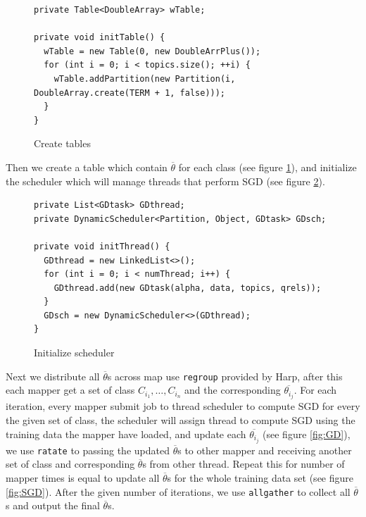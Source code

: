 \documentclass{sig-alternate-05-2015}
\begin{document}
\begin{figure}
\begin{lstlisting}
private Table<DoubleArray> wTable;
  
private void initTable() {
  wTable = new Table(0, new DoubleArrPlus());
  for (int i = 0; i < topics.size(); ++i) {
    wTable.addPartition(new Partition(i, DoubleArray.create(TERM + 1, false)));
  }
}
\end{lstlisting}
\caption{Create tables}
\label{fig:init}
\end{figure}

Then we create a table which contain $\overline{\theta}$ for each class (see figure \ref{fig:init}),
and initialize the scheduler which will manage threads that perform SGD (see figure \ref{fig:thread}).\par

\begin{figure}
\begin{lstlisting}
private List<GDtask> GDthread;
private DynamicScheduler<Partition, Object, GDtask> GDsch;

private void initThread() {
  GDthread = new LinkedList<>();
  for (int i = 0; i < numThread; i++) {
    GDthread.add(new GDtask(alpha, data, topics, qrels));
  }
  GDsch = new DynamicScheduler<>(GDthread);
}
\end{lstlisting}
\caption{Initialize scheduler}
\label{fig:thread}
\end{figure}


Next we distribute all $\overline{\theta}$s across map use \lstinline|regroup| provided by Harp,
after this each mapper get a set of class $C_{i_1},\ldots,C_{i_n}$ and the corresponding $\overline{\theta_{i_j}}$.
For each iteration, every mapper submit job to thread scheduler to compute SGD for every the given set of class,
the scheduler will assign thread to compute SGD using the training data the mapper have loaded,
and update each $\overline{\theta_{i_j}}$ (see figure \ref{fig:GD}), we use \lstinline|ratate| to passing the updated $\overline{\theta}$s to other mapper and
receiving another set of class and corresponding $\overline{\theta}$s from other thread.
Repeat this for number of mapper times is equal to update all $\overline{\theta}$s for the whole training data set (see figure \ref{fig:SGD}).
After the given number of iterations, we use \lstinline|allgather| to collect all $\overline{\theta}$s and output the final $\overline{\theta}$s.
\end{document}
